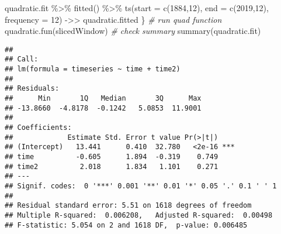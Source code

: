 \documentclass[
]{article}
\newenvironment{Shaded}{\begin{snugshade}}{\end{snugshade}}
\newcommand{\AttributeTok}[1]{\textcolor[rgb]{0.77,0.63,0.00}{#1}}
\newcommand{\CommentTok}[1]{\textcolor[rgb]{0.56,0.35,0.01}{\textit{#1}}}
\newcommand{\DecValTok}[1]{\textcolor[rgb]{0.00,0.00,0.81}{#1}}
\newcommand{\FunctionTok}[1]{\textcolor[rgb]{0.00,0.00,0.00}{#1}}
\newcommand{\NormalTok}[1]{#1}
\newcommand{\OtherTok}[1]{\textcolor[rgb]{0.56,0.35,0.01}{#1}}
\newcommand{\SpecialCharTok}[1]{\textcolor[rgb]{0.00,0.00,0.00}{#1}}
\begin{document}
\begin{Shaded}
\begin{Highlighting}[]
\NormalTok{  quadratic.fit }\SpecialCharTok{\%\textgreater{}\%} \FunctionTok{fitted}\NormalTok{() }\SpecialCharTok{\%\textgreater{}\%} \FunctionTok{ts}\NormalTok{(}\AttributeTok{start =} \FunctionTok{c}\NormalTok{(}\DecValTok{1884}\NormalTok{,}\DecValTok{12}\NormalTok{), }\AttributeTok{end =} \FunctionTok{c}\NormalTok{(}\DecValTok{2019}\NormalTok{,}\DecValTok{12}\NormalTok{), }\AttributeTok{frequency =} \DecValTok{12}\NormalTok{) }\OtherTok{{-}\textgreater{}\textgreater{}}
\NormalTok{    quadratic.fitted}
\NormalTok{\}}
\CommentTok{\# run quad function}
\FunctionTok{quadratic.fun}\NormalTok{(slicedWindow)}
\CommentTok{\# check summary}
\FunctionTok{summary}\NormalTok{(quadratic.fit)}
\end{Highlighting}
\end{Shaded}

\begin{verbatim}
## 
## Call:
## lm(formula = timeseries ~ time + time2)
## 
## Residuals:
##      Min       1Q   Median       3Q      Max 
## -13.8660  -4.8178  -0.1242   5.0853  11.9001 
## 
## Coefficients:
##             Estimate Std. Error t value Pr(>|t|)    
## (Intercept)   13.441      0.410  32.780   <2e-16 ***
## time          -0.605      1.894  -0.319    0.749    
## time2          2.018      1.834   1.101    0.271    
## ---
## Signif. codes:  0 '***' 0.001 '**' 0.01 '*' 0.05 '.' 0.1 ' ' 1
## 
## Residual standard error: 5.51 on 1618 degrees of freedom
## Multiple R-squared:  0.006208,   Adjusted R-squared:  0.00498 
## F-statistic: 5.054 on 2 and 1618 DF,  p-value: 0.006485
\end{verbatim}
\end{document}
